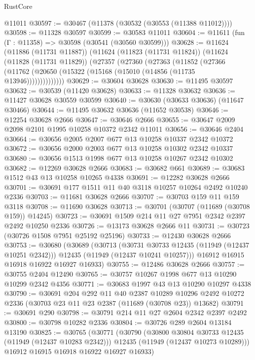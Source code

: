 \begin{lexlean}{RustCore}
\begin{coremodule}
    @11011
@30597 := @30467 (@11378 (@30532 (@30553 (@11388 @11012))))
@30598 := @11328 @30597
@30599 := @30583 @11011
@30604 := @11611 (fun (Γ : @11358) => @30598 (@30541 (@30560 @30599)))
@30628 := @11624
    (@11886 (@11731 @11887))
    (@11624
      (@11823 (@11731 @11824))
      (@11624
        (@11828 (@11731 @11829))
        (@27357
          (@27360
            (@27363
              (@11852
                (@27366 (@11762 (@20650 (@15322 (@15168 (@15010 (@14856 (@11735 @13946))))))))))))))
@30629 := @30604 @30628
@30630 := @11495 @30597
@30632 := @30539 (@11420 @30628)
@30633 := @11328 @30632
@30636 := @11427 @30628 @30559 @30599
@30640 := @30630 (@30633 @30636) (@11647 @30466)
@30644 := @11495 @30632 @30636 (@11652 @30538)
@30646 := @12254 @30628 @2666
@30647 := @30646 @2666
@30655 := @30647 @2009 @2098 @2101 @1995 @10258 @10372 @2342 @11011
@30656 := @30646 @2404
@30664 := @30656 @2005 @2007 @677 @13 @10258 @10337 @2342 @10372
@30672 := @30656 @2000 @2003 @677 @13 @10258 @10302 @2342 @10337
@30680 := @30656 @1513 @1998 @677 @13 @10258 @10267 @2342 @10302
@30682 := @12269 @30628 @2666
@30683 := @30682 @661
@30689 := @30683 @1512 @43 @13 @10258 @10265 @4338
@30691 := @12282 @30628 @2666
@30701 := @30691 @177 @1511 @11 @40 @3118 @10257 @10264 @2492 @10240 @2336
@30703 := @11681 @30628 @2666
@30707 := @30703 @159 @11 @159 @3118
@30708 := @11690 @30628
@30713 := @30701 (@30707 (@11689 (@30708 @159)) @14245)
@30723 := @30691 @1509 @214 @11 @27 @7951 @2342 @2397 @2492 @10250 @2336
@30726 := @13173 @30628 @2666 @11
@30731 := @30723 (@30726 @1508 @7951 @25192 @25196)
@30733 := @12430 @30628 @2666
@30753 := @30680
    (@30689
      (@30713
        (@30731 @30733 @12435 (@11949 (@12437 @10251 @2342)))
        @12435
        (@11949 (@12437 @10241 @10257)))
      @16912
      @16915
      @16918
      @16922
      @16927
      @16933)
@30755 := @12486 @30628 @2666
@30757 := @30755 @2404 @12490
@30765 := @30757 @10267 @1998 @677 @13 @10290 @10299 @2342 @4356
@30771 := @30683 @1997 @43 @13 @10290 @10297 @4338
@30790 := @30691
    @204
    @292
    @11
    @40
    @2387
    @10289
    @10296
    @2492
    @10272
    @2336
    (@30703 @23 @11 @23 @2387 (@11689 (@30708 @23)) @13682)
@30791 := @30691 @290
@30798 := @30791 @214 @11 @27 @2604 @2342 @2397 @2492
@30800 := @30798 @10282 @2336
@30804 := @30726 @289 @2604 @13184 @13190
@30825 := @30765
    (@30771
      (@30790
        (@30800 @30804 @30733 @12435 (@11949 (@12437 @10283 @2342)))
        @12435
        (@11949 (@12437 @10273 @10289)))
      @16912
      @16915
      @16918
      @16922
      @16927
      @16933)

\end{coremodule}
\end{lexlean}
